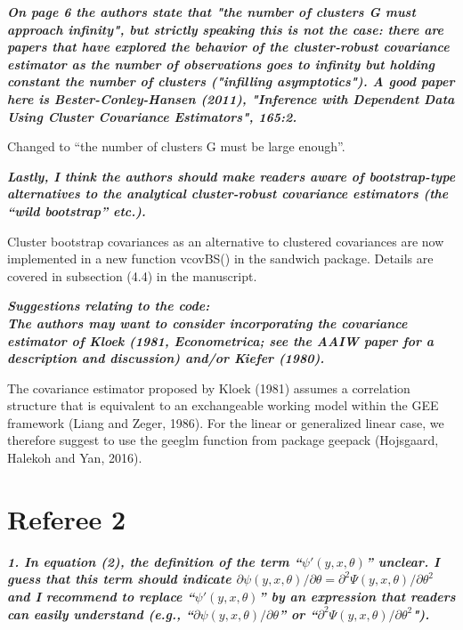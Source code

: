 \documentclass[10pt,a4paper]{article}
\begin{document}
\medskip

\textbf{\textit{
On page 6 the authors state that "the number of clusters G must approach infinity", but strictly speaking this is not the case: there are papers that have explored the behavior of the cluster-robust covariance estimator as the number of observations goes to infinity but holding constant the number of clusters ("infilling asymptotics").  A good paper here is Bester-Conley-Hansen (2011), "Inference with Dependent Data Using Cluster Covariance Estimators", 165:2.
}}

\medskip

Changed to ``the number of clusters G must be large enough''.

\medskip

\textbf{\textit{Lastly, I think the authors should make readers aware of bootstrap-type alternatives to the analytical cluster-robust covariance estimators (the ``wild bootstrap'' etc.).}}

\medskip

Cluster bootstrap covariances as an alternative to clustered covariances are now implemented in a new function vcovBS() in the sandwich package. Details are covered in subsection (4.4) in the manuscript.

\medskip

\textbf{\textit{Suggestions relating to the code:
\\
The authors may want to consider incorporating the  covariance estimator of Kloek (1981, Econometrica; see the AAIW paper for a description and discussion) and/or Kiefer (1980).}}

\medskip

The covariance estimator proposed by Kloek (1981) assumes a correlation structure that is equivalent to an exchangeable working model within the GEE framework (Liang and Zeger, 1986).
For the linear or generalized linear case, we therefore suggest to use the geeglm function from package geepack (Hojsgaard, Halekoh and Yan, 2016).

\section*{Referee 2}

\textbf{\textit{1. In equation (2), the definition of the term ``$\psi'(y, x, \theta)$'' unclear.
I guess that this term should indicate $\partial \psi(y, x, \theta)/\partial\theta = \partial^2\Psi(y, x, \theta)/\partial\theta^2$ and I recommend to replace ``$\psi'(y, x, \theta)$''
by an expression that readers can easily understand
(e.g., ``$\partial \psi(y, x, \theta)/\partial\theta$'' or ``$\partial^2\Psi(y, x, \theta)/\partial\theta^2$").}}
\end{document}
